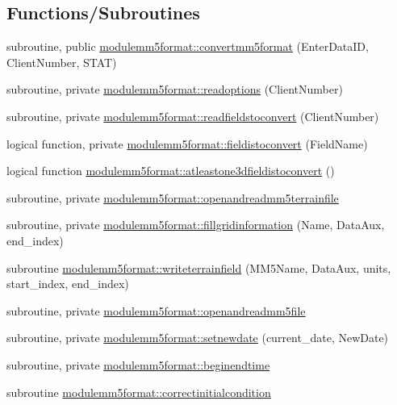 \subsection*{Functions/\+Subroutines}
\begin{DoxyCompactItemize}
\item 
subroutine, public \mbox{\hyperlink{namespacemodulemm5format_a1a626b0d9d1e86eb446e37da6e498536}{modulemm5format\+::convertmm5format}} (Enter\+Data\+ID, Client\+Number, S\+T\+AT)
\item 
subroutine, private \mbox{\hyperlink{namespacemodulemm5format_a97e9dde30f26c338513668851aff53f5}{modulemm5format\+::readoptions}} (Client\+Number)
\item 
subroutine, private \mbox{\hyperlink{namespacemodulemm5format_aab58f65fed0eaf2db8d40727bfaaf7ab}{modulemm5format\+::readfieldstoconvert}} (Client\+Number)
\item 
logical function, private \mbox{\hyperlink{namespacemodulemm5format_a06df0a4d83e5c07c6427f1e426280250}{modulemm5format\+::fieldistoconvert}} (Field\+Name)
\item 
logical function \mbox{\hyperlink{namespacemodulemm5format_a34e4f7cd15886ee4867c43357fc8f717}{modulemm5format\+::atleastone3dfieldistoconvert}} ()
\item 
subroutine, private \mbox{\hyperlink{namespacemodulemm5format_a1f3cc8db72c3a71a34ba6b95a7658651}{modulemm5format\+::openandreadmm5terrainfile}}
\item 
subroutine, private \mbox{\hyperlink{namespacemodulemm5format_a2871229a63fac4ca43cec154d7ed93d4}{modulemm5format\+::fillgridinformation}} (Name, Data\+Aux, end\+\_\+index)
\item 
subroutine \mbox{\hyperlink{namespacemodulemm5format_a5e2ead0b671ea8295a54332e57b9f3c0}{modulemm5format\+::writeterrainfield}} (M\+M5\+Name, Data\+Aux, units, start\+\_\+index, end\+\_\+index)
\item 
subroutine, private \mbox{\hyperlink{namespacemodulemm5format_a4a978d934b39be4e1dd62a5701e05c93}{modulemm5format\+::openandreadmm5file}}
\item 
subroutine, private \mbox{\hyperlink{namespacemodulemm5format_a87a63ca9f90961d4aa43cc6653ea5083}{modulemm5format\+::setnewdate}} (current\+\_\+date, New\+Date)
\item 
subroutine, private \mbox{\hyperlink{namespacemodulemm5format_a0c8ad12e555e63fe83da5b09ae5e7126}{modulemm5format\+::beginendtime}}
\item 
subroutine \mbox{\hyperlink{namespacemodulemm5format_aecf73e96a833b95d469c3682bf5df737}{modulemm5format\+::correctinitialcondition}}

\end{DoxyCompactItemize}
